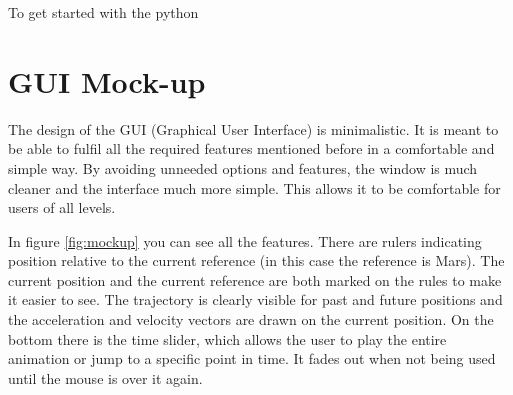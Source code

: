 \documentclass[a4paper,11pt]{article}
\begin{document}
To get started with the python


\section{GUI Mock-up}

The design of the GUI (Graphical User Interface) is minimalistic. It is meant to be able to fulfil all the required features mentioned before in a comfortable and simple way. By avoiding unneeded options and features, the window is much cleaner and the interface much more simple. This allows it to be comfortable for users of all levels.

In figure \ref{fig:mockup} you can see all the features. There are rulers indicating position relative to the current reference (in this case the reference is Mars). The current position and the current reference are both marked on the rules to make it easier to see. The trajectory is clearly visible for past and future positions and the acceleration and velocity vectors are drawn on the current position. On the bottom there is the time slider, which allows the user to play the entire animation or jump to a specific point in time. It fades out when not being used until the mouse is over it again.
\end{document}
